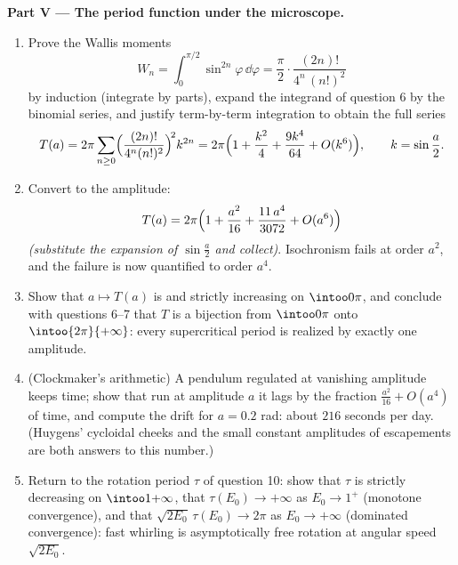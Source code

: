 \begin{problem}
\medskip
\noindent\textbf{Part V --- The period function under the
microscope.}
\begin{enumerate}[resume]
  \item Prove the Wallis moments
        \[
        W_n = \int_0^{\pi/2}\sin^{2n}\varphi\,\dd\varphi
        = \frac\pi2\cdot\frac{(2n)!}{4^n\,(n!)^2}
        \]
        by induction (integrate by parts), expand the
        integrand of question 6 by the binomial series, and
        justify term-by-term integration to obtain the full
        series
        \[
        T(a) = 2\pi\sum_{n\geq0}
        \Bigl(\frac{(2n)!}{4^n(n!)^2}\Bigr)^{\!2}k^{2n}
        = 2\pi\Bigl(1 + \frac{k^2}4 + \frac{9k^4}{64}
        + O(k^6)\Bigr),
        \qquad k = \sin\frac a2 .
        \]
  \item Convert to the amplitude:
        \[
        T(a) = 2\pi\Bigl(1 + \frac{a^2}{16} +
        \frac{11\,a^4}{3072} + O(a^6)\Bigr)
        \]
        \emph{(substitute the expansion of $\sin\frac a2$
        and collect)}. Isochronism fails at order $a^2$, and
        the failure is now quantified to order $a^4$.
  \item Show that $a \mapsto T(a)$ is  and
        strictly increasing on $\intoo0\pi$, and conclude
        with questions 6--7 that $T$ is a bijection from
        $\intoo0\pi$ onto $\intoo{2\pi}{+\infty}$: every
        supercritical period is realized by exactly one
        amplitude.
  \item (Clockmaker's arithmetic) A pendulum regulated at
        vanishing amplitude keeps  time; show that run
        at amplitude $a$ it lags by the fraction
        $\frac{a^2}{16} + O(a^4)$ of  time, and compute
        the drift for $a = 0.2$ rad: about $216$ seconds per
        day. (Huygens' cycloidal cheeks and the small
        constant amplitudes of escapements are both answers
        to this number.)
  \item Return to the rotation period $\tau$ of question
        10: show that $\tau$ is strictly decreasing on
        $\intoo1{+\infty}$, that $\tau(E_0) \to +\infty$ as
        $E_0 \to 1^+$ (monotone convergence), and that
        $\sqrt{2E_0}\,\tau(E_0) \to 2\pi$ as $E_0 \to
        +\infty$ (dominated convergence): fast whirling is
        asymptotically free rotation at angular speed
        $\sqrt{2E_0}$.
\end{enumerate}


\end{problem}

